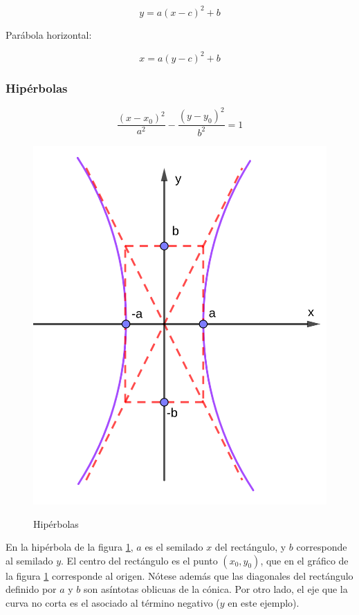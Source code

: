 \documentclass{article}
\begin{document}
\begin{equation}
y = a (x-c)^2 + b
\end{equation}

Parábola horizontal:

\begin{equation}
x = a (y-c)^2 + b
\end{equation}

\subsubsection{Hipérbolas}

\begin{equation}
\frac{(x-x_0)^2}{a^2} - \frac{(y-y_0)^2}{b^2} = 1
\end{equation}

\begin{figure}[ht]
\caption{Hipérbolas}
\includegraphics[scale=0.8]{img/teo_fig002_hiperbolas.png} 
\centering
\label{fig:hiperbolas}
\end{figure}

En la hipérbola de la figura \ref{fig:hiperbolas}, $a$ es el semilado $x$ del rectángulo, y $b$ corresponde al semilado $y$. El centro del rectángulo es el punto $(x_0, y_0)$, que en el gráfico de la figura \ref{fig:hiperbolas} corresponde al origen. 
Nótese además que las diagonales del rectángulo definido por $a$ y $b$ son asíntotas oblicuas de la cónica. Por otro lado, el eje que la curva no corta es el asociado al término negativo ($y$ en este ejemplo).
\end{document}
